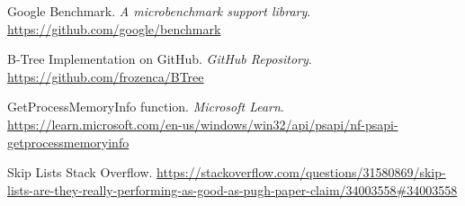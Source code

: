 \documentclass[12pt]{article}
\begin{document}
\begin{thebibliography}{9}
	Google Benchmark. 
	\textit{A microbenchmark support library}. \\
	\url{https://github.com/google/benchmark}

	B-Tree Implementation on GitHub. 
	\textit{GitHub Repository}. \\
	\url{https://github.com/frozenca/BTree}

	GetProcessMemoryInfo function. 
	\textit{Microsoft Learn}. \\
	\url{https://learn.microsoft.com/en-us/windows/win32/api/psapi/nf-psapi-getprocessmemoryinfo}

	Skip Lists Stack Overflow.
	\sloppy\url{https://stackoverflow.com/questions/31580869/skip-lists-are-they-really-performing-as-good-as-pugh-paper-claim/34003558\#34003558}

\end{thebibliography}

	
\end{document}
